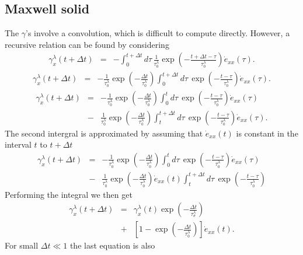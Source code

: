 \documentclass[11pt]{article}
\begin{document}
\subsection*{Maxwell solid}
The $\gamma$'s involve a convolution, which is difficult to compute directly.
However, a recursive relation can be found by considering
\begin{eqnarray*}
\gamma^{\lambda}_x(t+\Delta t) & = &
  -\int^{t+\Delta t}_0 d\tau\,
  \frac{1}{\tau^{\lambda}_0}
  \exp(-\frac{t+\Delta t -\tau}{\tau^{\lambda}_0})
  \dot{e}_{xx}(\tau).
\end{eqnarray*}
\begin{eqnarray*}
\gamma^{\lambda}_x(t+\Delta t) & = &
  -\frac{1}{\tau^{\lambda}_{0}}
  \exp(-\frac{\Delta t}{\tau^{\lambda}_{0}})
  \int^{t+\Delta t}_{0} d\tau\,
  \exp(-\frac{t-\tau}{\tau^{\lambda}_{0}})
  \dot{e}_{xx}(\tau).
\end{eqnarray*}
\begin{eqnarray*}
\gamma^{\lambda}_x(t+\Delta t) 
 & = & 
  -\frac{1}{\tau^{\lambda}_0}
  \exp(-\frac{\Delta t}{\tau^{\lambda}_{0}})
  \int^{t}_0 d\tau\,
  \exp(-\frac{t-\tau}{\tau^{\lambda}_{0}})
  \dot{e}_{xx}(\tau)\\
 & - &
  \frac{1}{\tau^{\lambda}_{0}}
  \exp(-\frac{\Delta t}{\tau^{\lambda}_{0}})
  \int^{t+\Delta t}_t d\tau\,
  \exp(-\frac{t-\tau}{\tau^{\lambda}_{0}})
  \dot{e}_{xx}(\tau).
\end{eqnarray*}
The second intergral is approximated by
 assuming that $\dot{e}_{xx}(t)$ is constant in the interval $t$ to $t+\Delta t$
\begin{eqnarray*}
\gamma^{\lambda}_x(t+\Delta t) 
 & = & 
  -\frac{1}{\tau^{\lambda}_{0}}
\exp(-\frac{\Delta t}{\tau^{\lambda}_{0}})
       \int^{t}_0 d\tau\,
       \exp(-\frac{t-\tau}{\tau^{\lambda}_{0}})
       \dot{e}_{xx}(\tau)\\
 & - &
       \frac{1}{\tau^{\lambda}_{0}} \exp(-\frac{\Delta t}{\tau^{\lambda}_{0}})
       \dot{e}_{xx}(t)\int^{t+\Delta t}_t d\tau\,
       \exp(-\frac{t-\tau}{\tau^{\lambda}_{0}})
\end{eqnarray*}
Performing the integral we then get
\begin{eqnarray*}
\gamma^{\lambda}_x(t+\Delta t) 
   & = & \gamma^{\lambda}_x (t)\exp(-\frac{\Delta t}{\tau^{\lambda}_{\sigma}}) \\
   & + & 
         \left[1-\exp(-\frac{\Delta t}{\tau^{\lambda}_{0}})\right]
         \dot{e}_{xx}(t).
\end{eqnarray*}
%
For small $\Delta t \ll 1$ the last equation is also
\end{document}
